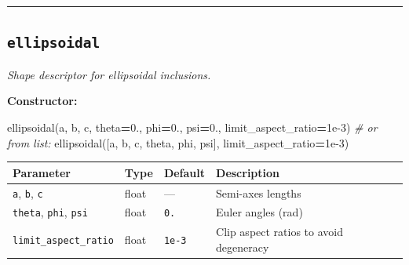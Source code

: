 \documentclass[
  a4paper,
  numbers=noendperiod,
  DIV=12]{scrreprt}
\newenvironment{Shaded}{\begin{snugshade}}{\end{snugshade}}
\newcommand{\CommentTok}[1]{\textcolor[rgb]{0.56,0.35,0.01}{\textit{#1}}}
\newcommand{\FloatTok}[1]{\textcolor[rgb]{0.00,0.00,0.81}{#1}}
\newcommand{\NormalTok}[1]{#1}
\newcommand{\OperatorTok}[1]{\textcolor[rgb]{0.81,0.36,0.00}{\textbf{#1}}}
\newcounter{none} %
\begin{document}
\begin{center}\rule{0.5\linewidth}{0.5pt}\end{center}

\subsection{\texorpdfstring{\texttt{ellipsoidal}}{ellipsoidal}}\label{api-ellipsoidal}

\emph{Shape descriptor for ellipsoidal inclusions.}

\textbf{Constructor:}

\begin{Shaded}
\begin{Highlighting}[]
\NormalTok{ellipsoidal(a, b, c, theta}\OperatorTok{=}\FloatTok{0.}\NormalTok{, phi}\OperatorTok{=}\FloatTok{0.}\NormalTok{, psi}\OperatorTok{=}\FloatTok{0.}\NormalTok{, limit\_aspect\_ratio}\OperatorTok{=}\FloatTok{1e{-}3}\NormalTok{)}
\CommentTok{\# or from list:}
\NormalTok{ellipsoidal([a, b, c, theta, phi, psi], limit\_aspect\_ratio}\OperatorTok{=}\FloatTok{1e{-}3}\NormalTok{)}
\end{Highlighting}
\end{Shaded}

{\def\LTcaptype{none} %
\begin{longtable}[]{@{}
  >{\raggedright\arraybackslash}p{}
  >{\raggedright\arraybackslash}p{}
  >{\raggedright\arraybackslash}p{}
  >{\raggedright\arraybackslash}p{}@{}}
\toprule\noalign{}
\begin{minipage}[b]{\linewidth}\raggedright
Parameter
\end{minipage} & \begin{minipage}[b]{\linewidth}\raggedright
Type
\end{minipage} & \begin{minipage}[b]{\linewidth}\raggedright
Default
\end{minipage} & \begin{minipage}[b]{\linewidth}\raggedright
Description
\end{minipage} \\
\midrule\noalign{}
\endhead
\bottomrule\noalign{}
\endlastfoot
\texttt{a}, \texttt{b}, \texttt{c} & float & --- & Semi-axes lengths \\
\texttt{theta}, \texttt{phi}, \texttt{psi} & float & \texttt{0.} & Euler
angles (rad) \\
\texttt{limit\_aspect\_ratio} & float & \texttt{1e-3} & Clip aspect
ratios to avoid degeneracy \\
\end{longtable}
}
\end{document}
